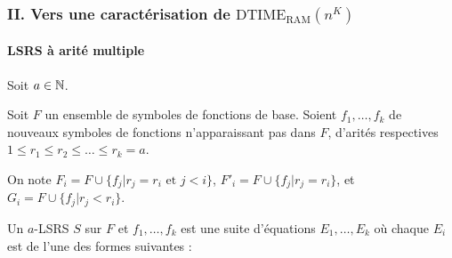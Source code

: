 \documentclass[10pt]{beamer}
\newcommand{\dtimeram}{\text{DTIME}_{\text{RAM}}\left( n^K \right)}
\begin{document}
	
	\begin{frame}
		\frametitle{II. Vers une caractérisation de $\dtimeram$}
		\framesubtitle{LSRS à arité multiple}
		
		Soit $a \in \mathbb{N}$.
		
		\begin{defn}[$a$-LSRS]
			Soit $F$ un ensemble de symboles de fonctions de base. Soient $f_1, \dots, f_k$ de nouveaux symboles de fonctions n'apparaissant pas dans $F$, d'arités respectives $1 \leqslant r_1 \leqslant r_2 \leqslant \dots \leqslant r_k = a$.
			
			On note $F_i = F \cup \{f_j | r_j = r_i \text{ et } j < i\}$, $F'_i = F \cup \{f_j | r_j = r_i\}$, et $G_i = F \cup \{ f_j | r_j < r_i\}$. %
			
			
			Un $a$-LSRS $S$ sur $F$ et $f_1, \dots, f_k$ est une suite d'équations $E_1, \dots, E_k$ où chaque $E_i$ est de l'une des formes suivantes :
			
			

\end{defn}
\end{frame}
\end{document}
